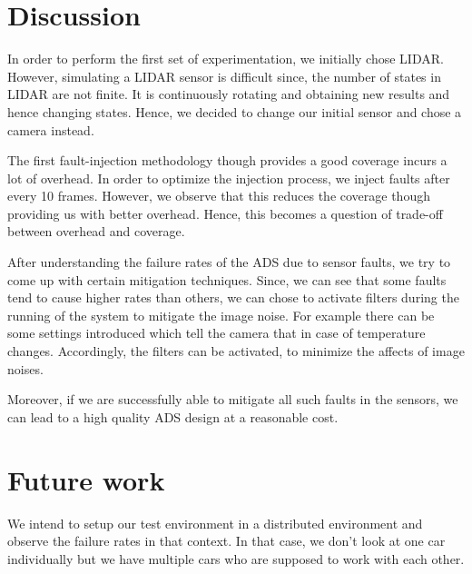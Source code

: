 \section{Discussion}
In order to perform the first set of experimentation, we initially chose LIDAR. However, simulating a LIDAR sensor is difficult since, the number of states in LIDAR are not finite. It is continuously rotating and obtaining new results and hence changing states. Hence, we decided to change our initial sensor and chose a camera instead.

The first fault-injection methodology though provides a good coverage incurs a lot of overhead. In order to optimize the injection process, we inject faults after every 10 frames. However, we observe that this reduces the coverage though providing us with better overhead. Hence, this becomes a question of trade-off between overhead and coverage. 

After understanding the failure rates of the ADS due to sensor faults, we try to come up with certain mitigation techniques. Since, we can see that some faults tend to cause higher rates than others, we can chose to activate filters during the running of the system to mitigate the image noise. For example there can be some settings introduced which tell the camera that in case of temperature changes. Accordingly, the filters can be activated, to minimize the affects of image noises. 

Moreover, if we are successfully able to mitigate all such faults in the sensors, we can lead to a high quality ADS design at a reasonable cost.



\section{Future work}
We intend to setup our test environment in a distributed environment and observe the failure rates in that context. In that case, we don't look at one car individually but we have multiple cars who are supposed to work with each other.

